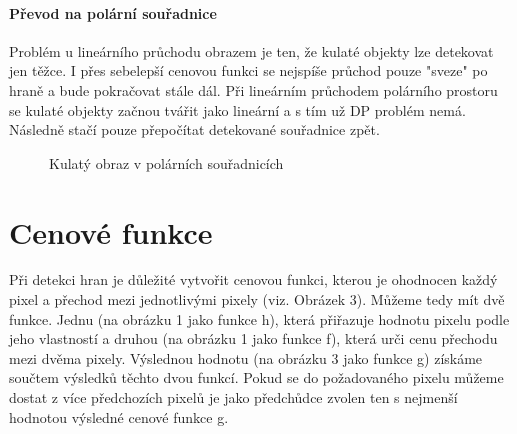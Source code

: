 \documentclass[12pt,a4paper,titlepage,final]{report}
\begin{document}
\paragraph{Převod na polární souřadnice} Problém u lineárního průchodu obrazem je ten, že kulaté objekty lze detekovat jen těžce. I přes sebelepší cenovou funkci se nejspíše průchod pouze "sveze" po hraně a bude pokračovat stále dál. Při lineárním průchodem polárního prostoru se kulaté objekty začnou tvářit jako lineární a s tím už DP problém nemá. Následně stačí pouze přepočítat detekované souřadnice zpět.

\begin{figure}[ht]
		\caption{Kulatý obraz v polárních souřadnicích}
\label{fig:snimac}
\end{figure}

\section{Cenové funkce}

Při detekci hran je důležité vytvořit cenovou funkci, kterou je ohodnocen každý pixel a přechod mezi jednotlivými pixely (viz. Obrázek 3). Můžeme tedy mít dvě funkce. Jednu (na obrázku 1 jako funkce h), která přiřazuje hodnotu pixelu podle jeho vlastností a druhou (na obrázku 1 jako funkce f), která urči cenu přechodu mezi dvěma pixely.  Výslednou hodnotu (na obrázku 3 jako funkce g) získáme součtem výsledků těchto dvou funkcí. Pokud se do požadovaného pixelu můžeme dostat z více předchozích pixelů je jako předchůdce zvolen ten s nejmenší hodnotou výsledné cenové funkce g. 
\end{document}
